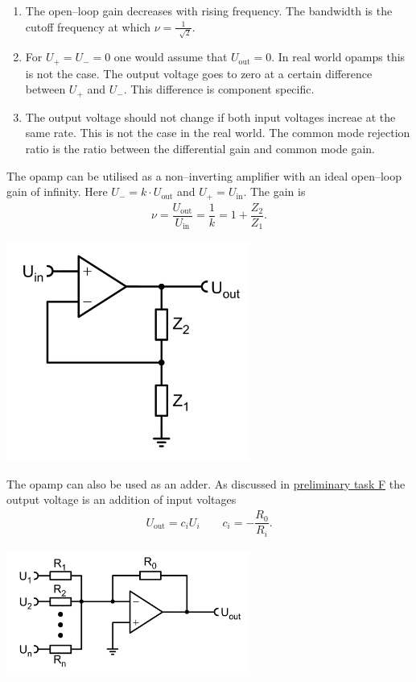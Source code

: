 \documentclass[a4paper,10pt]{article}
\newenvironment{Figure}
        {\par\medskip\noindent\minipage{\linewidth}}
        {\endminipage\par\medskip}
\numberwithin{equation}{section}
\begin{document}
\begin{multicols}{2}
\begin{enumerate}[label=--]
		\item The open--loop gain decreases with rising frequency.
		      The bandwidth is the cutoff frequency at which $\nu =\tfrac{1}{\,\sqrt[]{2}}$.
		\item For $U_+=U_-=0$ one would assume that $U_\text{out}=0$.
		      In real world opamps this is not the case.
		      The output voltage goes to zero at a certain difference between $U_+$ and $U_-$.
		      This difference is component specific.
		\item The output voltage should not change if both input voltages increae at the same rate.
		      This is not the case in the real world.
		      The common mode rejection ratio is the ratio between the differential gain and common mode gain.
	\end{enumerate}
	The opamp can be utilised as a non--inverting amplifier with an ideal open--loop gain of infinity.
	Here $U_-=k\cdot U_\text{out}$ and $U_+=U_\text{in}$.
	The gain is
	\begin{align}
		\nu =\dfrac{U_\text{out}}{U_\text{in}}=\dfrac{1}{k}=1+\dfrac{Z_2}{Z_1}
		.\end{align}
	\begin{Figure}
		\centering
		\includegraphics[width=0.6\textwidth]{noninverting_amp.png}
		 \label{fig:non--inverting amplifier}
	\end{Figure}
	\noindent The opamp can also be used as an adder.
	As discussed in \hyperref[pre:F]{preliminary task F} the output voltage is an addition of input voltages
	\begin{align}
		U_\text{out}=c_iU_i\qquad c_i=-\dfrac{R_0}{R_i}
		.\end{align}
	\begin{Figure}
		\centering
		\includegraphics[width=0.6\textwidth]{adder.png}

\end{Figure}
\end{multicols}
\end{document}
